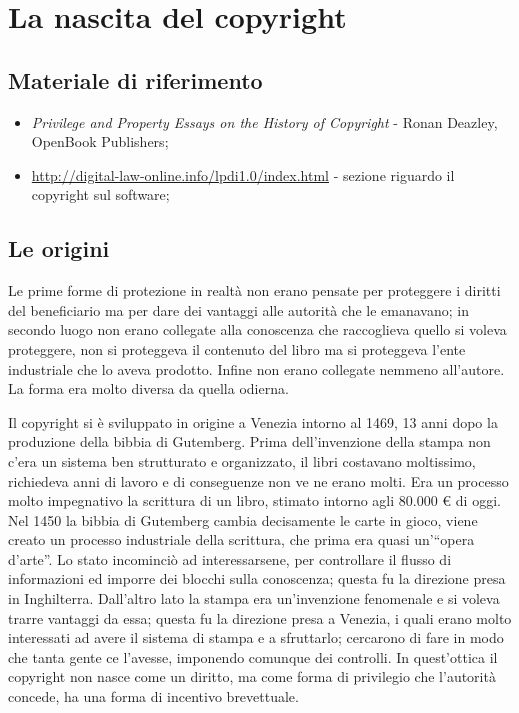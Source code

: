 \section{La nascita del copyright}

\subsection*{Materiale di riferimento}

\begin{itemize}

\item \textit{Privilege and Property Essays on the History of Copyright} - Ronan Deazley, OpenBook Publishers;
\item \url{http://digital-law-online.info/lpdi1.0/index.html} - sezione riguardo il copyright sul software;

\end{itemize}

\subsection{Le origini}

Le prime forme di protezione in realtà non erano pensate per proteggere i diritti del beneficiario ma per dare dei vantaggi alle autorità che le emanavano; in secondo luogo non erano collegate alla conoscenza che raccoglieva quello si voleva proteggere, non si proteggeva il contenuto del libro ma si proteggeva l'ente industriale che lo aveva prodotto. Infine non erano collegate nemmeno all'autore. La forma era molto diversa da quella odierna.

Il copyright si è sviluppato in origine a Venezia intorno al 1469, 13 anni dopo la produzione della bibbia di Gutemberg. Prima dell'invenzione della stampa non c'era un sistema ben strutturato e organizzato, il libri costavano moltissimo, richiedeva anni di lavoro e di conseguenze non ve ne erano molti. Era un processo molto impegnativo la scrittura di un libro, stimato intorno agli 80.000 \euro{} di oggi. Nel 1450 la bibbia di Gutemberg cambia decisamente le carte in gioco, viene creato un processo industriale della scrittura, che prima era quasi un'``opera d'arte''. Lo stato incominciò ad interessarsene, per controllare il flusso di informazioni ed imporre dei blocchi sulla conoscenza; questa fu la direzione presa in Inghilterra. Dall'altro lato la stampa era un'invenzione fenomenale e si voleva trarre vantaggi da essa; questa fu la direzione presa a Venezia, i quali erano molto interessati ad avere il sistema di stampa e a sfruttarlo; cercarono di fare in modo che tanta gente ce l'avesse, imponendo comunque dei controlli. In quest'ottica il copyright non nasce come un diritto, ma come forma di privilegio che l'autorità concede, ha una forma di incentivo brevettuale.


